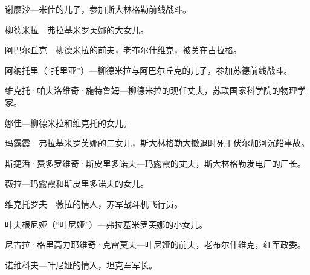 谢廖沙—米佳的儿子，参加斯大林格勒前线战斗。

柳德米拉—弗拉基米罗芙娜的大女儿。

阿巴尔丘克—柳德米拉的前夫，老布尔什维克，被关在古拉格。

阿纳托里（“托里亚”）—柳德米拉与阿巴尔丘克的儿子，参加苏德前线战斗。

维克托·帕夫洛维奇·施特鲁姆—柳德米拉的现任丈夫，苏联国家科学院的物理学家。

娜佳—柳德米拉和维克托的女儿。

玛露霞—弗拉基米罗芙娜的二女儿，斯大林格勒大撤退时死于伏尔加河沉船事故。

斯捷潘·费多罗维奇·斯皮里多诺夫—玛露霞的丈夫，斯大林格勒发电厂的厂长。

薇拉—玛露霞和斯皮里多诺夫的女儿。

维克托罗夫—薇拉的情人，苏军战斗机飞行员。

叶夫根尼娅（“叶尼娅”）—弗拉基米罗芙娜的小女儿。

尼古拉·格里高力耶维奇·克雷莫夫—叶尼娅的前夫，老布尔什维克，红军政委。

诺维科夫—叶尼娅的情人，坦克军军长。


